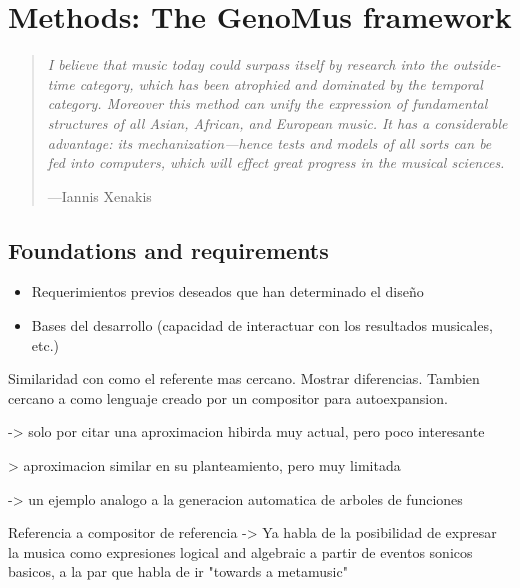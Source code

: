 \documentclass{article}
\begin{document}
\section{Methods: The GenoMus framework}
\begin{samepage}
\begin{quotation}
\textsl{I believe that music today could surpass itself by research into the outside-time category, which has been atrophied and dominated by the
temporal category. Moreover this method can unify the expression of
fundamental structures of all Asian, African, and European music. It has a
considerable advantage: its mechanization---hence tests and models of
all sorts can be fed into computers, which will effect great progress in the
musical sciences.}

---Iannis Xenakis \cite{xenakis1971formalized}
\end{quotation}
\end{samepage}



\subsection{Foundations and requirements}



{\color{gray}
\begin{itemize}
\item Requerimientos previos deseados que han determinado el diseño
\item Bases del desarrollo (capacidad de interactuar con los resultados musicales, etc.)
\end{itemize}
}




 



{\color{red}
Similaridad con \cite{Hofmann2015} como el referente mas cercano. Mostrar diferencias. Tambien cercano a \cite{ArizaOpenDesign} como lenguaje creado por un compositor para autoexpansion.

\cite{crawford2015algorithmic} -> solo por citar una aproximacion hibirda muy actual, pero poco interesante

\cite{delaPuente2002} > aproximacion similar en su planteamiento, pero muy limitada

\cite{Laine} -> un ejemplo analogo a la generacion automatica de arboles de funciones

Referencia a compositor de referencia -> \cite{xenakis1971formalized}
Ya habla de la posibilidad de expresar la musica como expresiones logical and algebraic a partir de eventos sonicos basicos, a la par que habla de ir "towards a metamusic" 
}
\end{document}
